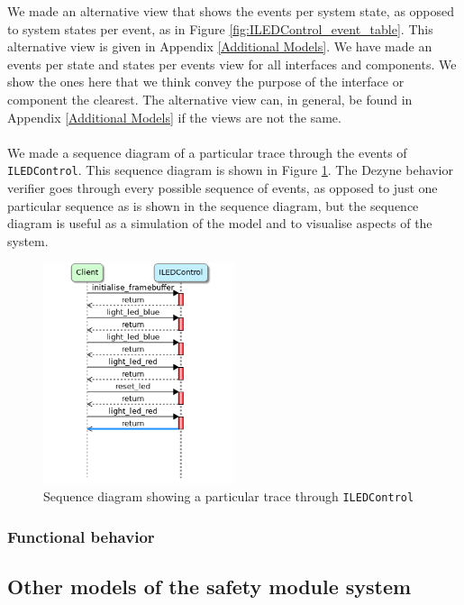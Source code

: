 \documentclass[12pt]{scrreprt}
\begin{document}
We made an alternative view that shows the events per system state, as opposed to system states per event, as in Figure \ref{fig:ILEDControl_event_table}. This alternative view is given in Appendix \ref{Additional Models}. We have made an events per state and states per events view for all interfaces and components. We show the ones here that we think convey the purpose of the interface or component the clearest. The alternative view can, in general, be found in Appendix \ref{Additional Models} if the views are not the same.
\\\\
We made a sequence diagram of a particular trace through the events of \texttt{ILEDControl}. This sequence diagram is shown in Figure \ref{fig:ILEDControl_seq}. The Dezyne behavior verifier goes through every possible sequence of events, as opposed to just one particular sequence as is shown in the sequence diagram, but the sequence diagram is useful as a simulation of the model and to visualise aspects of the system.

\begin{figure}[H]
    \centering
    \includegraphics[width=0.5\textwidth]{Figures/results/modelling_figures/ILEDControl/ILEDControl_seq.png}
    \caption{Sequence diagram showing a particular trace through \texttt{ILEDControl}}
    \label{fig:ILEDControl_seq}
\end{figure}

\subsubsection{Functional behavior}

\subsection{Other models of the safety module system}
\label{Other models of the system}
\end{document}

